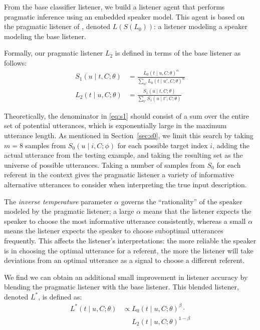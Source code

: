 \documentclass[11pt,letterpaper]{article}
\newcommand{\term}{\textit}
\newcommand{\Listener}{L}
\newcommand{\Speaker}{S}
\newcommand{\utt}{u}
\newcommand{\context}{C}
\newcommand{\target}{t}
\newcommand{\numsamples}{m}
\renewcommand{\|}{\mid}
\newcommand{\secref}[1]{Section~\ref{#1}}
\begin{document}
From the base classifier listener, we build a listener agent that performs
pragmatic inference using an embedded speaker model. This agent is based on the
pragmatic listener of , denoted
$\Listener(\Speaker(\Listener_0))$: a listener modeling a speaker modeling the
base listener.

Formally, our pragmatic listener $\Listener_2$ is defined in terms of the base
listener as follows:
\begin{align}
\Speaker_1(\utt \| \target, \context; \theta) &= \frac{\Listener_0(\target \| \utt, \context; \theta)^\alpha}{\sum_{\utt'} \Listener_0(\target \| \utt', \context; \theta)^\alpha} \label{eq:s1} \\
\Listener_2(\target \| \utt, \context; \theta) &= \frac{\Speaker_1(\utt \| \target, \context; \theta)}{\sum_{\target'} \Speaker_1(\utt \| \target', \context; \theta)} \nonumber
\end{align}

Theoretically, the denominator in \eqref{eq:s1} should consist of a sum over
the entire set of potential utterances, which is exponentially large in the
maximum utterance length. As mentioned in \secref{sec:s0}, we limit this search by
taking $\numsamples = 8$ samples from $\Speaker_0(\utt \| i, \context; \phi)$ for
each possible target index $i$, adding the actual utterance from the testing example,
and taking the resulting set as the universe of possible utterances. Taking a number
of samples from $\Speaker_0$ for each referent in the context gives the pragmatic
listener a variety of informative alternative utterances to consider when
interpreting the true input description.

The \term{inverse temperature} parameter $\alpha$ governs the ``rationality'' of
the speaker modeled by the pragmatic listener; a large $\alpha$ means that the
listener expects the speaker to choose the most informative utterance consistently, 
whereas a small $\alpha$ means the listener expects the speaker to choose suboptimal
utterances frequently. This affects the listener's interpretations: the more reliable
the speaker is in choosing the optimal utterance for a referent, the more the
listener will take deviations from an optimal utterance as a signal to choose a
different referent.

We find we can obtain an additional small improvement in listener accuracy
by blending the pragmatic listener with the base listener. This blended listener,
denoted $\Listener^*$, is defined as:
\begin{align}
\Listener^{*}(\target \| \utt, \context; \theta) &\propto {\Listener_0}(\target \| \utt, \context; \theta)^{\beta} \cdot {} \nonumber \\
&\phantom{{} \propto {}} \Listener_2(\target \| \utt, \context; \theta)^{1-\beta}  \label{eq:beta}
\end{align}
\end{document}
